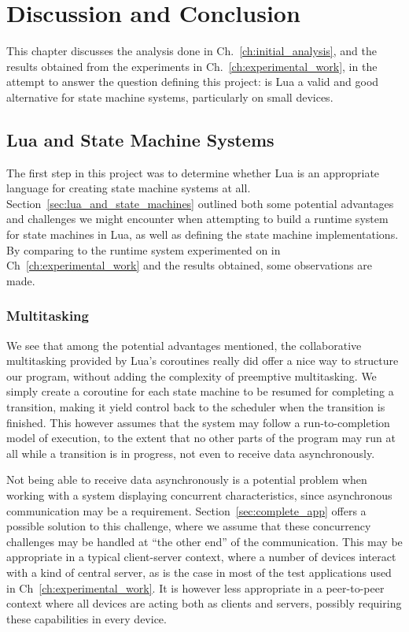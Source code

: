 \chapter{Discussion and Conclusion}
\label{ch:discussion_conclusion}
This chapter discusses the analysis done in Ch.~\ref{ch:initial_analysis}, and the results obtained from the experiments in Ch.~\ref{ch:experimental_work}, in the attempt to answer the question defining this project: is Lua a valid and good alternative for state machine systems, particularly on small devices.

\section{Lua and State Machine Systems}
\label{sec:disq_lua_stm}
The first step in this project was to determine whether Lua is an appropriate language for creating state machine systems at all. Section~\ref{sec:lua_and_state_machines} outlined both some potential advantages and challenges we might encounter when attempting to build a runtime system for state machines in Lua, as well as defining the state machine implementations. By comparing to the runtime system experimented on in Ch~\ref{ch:experimental_work} and the results obtained, some observations are made.

\subsection{Multitasking}
\label{sec:disq_multitasking}
We see that among the potential advantages mentioned, the collaborative multitasking provided by Lua's coroutines really did offer a nice way to structure our program, without adding the complexity of preemptive multitasking. We simply create a coroutine for each state machine to be resumed for completing a transition, making it yield control back to the scheduler when the transition is finished. This however assumes that the system may follow a run-to-completion model of execution, to the extent that no other parts of the program may run at all while a transition is in progress, not even to receive data asynchronously.

\noindent
Not being able to receive data asynchronously is a potential problem when working with a system displaying concurrent characteristics, since asynchronous communication may be a requirement. Section~\ref{sec:complete_app} offers a possible solution to this challenge, where we assume that these concurrency challenges may be handled at ``the other end'' of the communication. This may be appropriate in a typical client-server context, where a number of devices interact with a kind of central server, as is the case in most of the test applications used in Ch~\ref{ch:experimental_work}. It is however less appropriate in a peer-to-peer context where all devices are acting both as clients and servers, possibly requiring these capabilities in every device.

